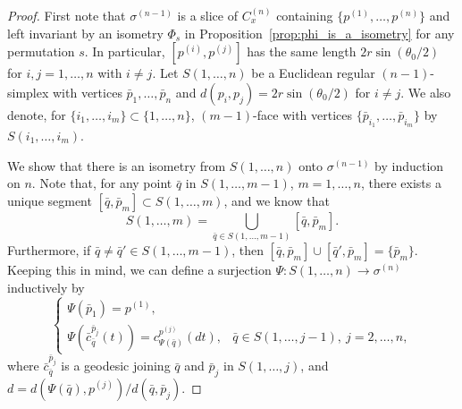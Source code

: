 \documentclass[12pt]{amsart}
\numberwithin{equation}{section}
\theoremstyle{plain}
\theoremstyle{definition}
\theoremstyle{remark}
\newcommand{\p}[1]{p^{(#1)}}
\newcommand{\zure}{\theta_0}
\begin{document}
\begin{proof}
 First note that $\sigma^{(n-1)}$ is a slice of $C_{x}^{(n)}$
 containing $\{p^{(1)},\dots, p^{(n)}\}$ and left invariant by an
 isometry $\Phi_{s}$ in Proposition~\ref{prop:phi_is_a_isometry} for any
 permutation $s$. In particular, $[\p{i},\p{j}]$ has the same length
 $2r\sin (\zure/2)$ for $i,j=1, \dots, n$ with $i\not= j$. 
 Let $S(1, \dots, n)$ be a Euclidean regular
 $(n-1)$-simplex with vertices $\bar p_1, \dots, \bar p_n$ and
 $d(p_i,p_j)=2r\sin (\zure/2)$ for $i\not= j$. 
 We also denote, for $\{i_1, \dots, i_m\}\subset \{1,\dots, n\}$, 
 $(m-1)$-face with vertices $\{\bar p_{i_1}, \dots, \bar p_{i_m}\}$ by
 $S(i_1, \dots, i_m)$. 
 
 We show that there is an isometry from 
 $S(1, \dots, n)$ onto
 $\sigma^{(n-1)}$ by induction on $n$. 
 Note that, for any point $\bar q$ in $S(1,\dots, m-1)$, $m=1,\dots, n$, 
 there exists a unique segment 
 $[\bar q,\bar p_m] \subset S(1,\dots, m)$, 
 and we know that
 \begin{equation*}
  S(1, \dots, m)=\bigcup_{\bar q \in S(1, \dots, m-1)} [\bar q, \bar p_m]. 
 \end{equation*}
 Furthermore,  if 
 $\bar q\not= \bar q' \in S(1, \dots, m-1)$, then 
 $[\bar q,\bar p_m]\cup [\bar q',\bar p_m]=\{\bar p_m\}$. 
 Keeping this in mind,  we can define a surjection 
 $\Psi\colon S(1,\dots,n)\rightarrow \sigma^{(n)}$ inductively by
\begin{equation*}
\begin{cases}
  \Psi(\bar p_1)=p^{(1)}, & \ \\
 \Psi(\bar c_{\bar q}^{\bar p_j}(t))=c_{\Psi(\bar q)}^{\p{j}}(dt), 
  & \bar q \in S(1,\dots, j-1), \ j=2,\dots, n, 
\end{cases}
\end{equation*}
 where $\bar c_{\bar q}^{\bar p_j}$ 
 is a geodesic joining $\bar q$ and $\bar p_j$ in $S(1,\dots,j)$, 
 and $d=d(\Psi(\bar q),\p{j})/d(\bar q, \bar p_j)$.  


\end{proof}
\end{document}
